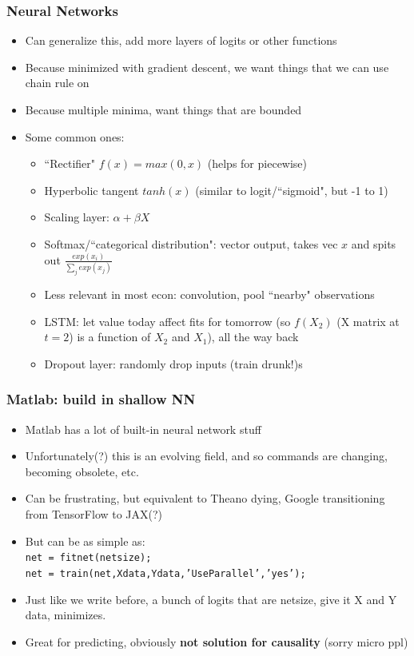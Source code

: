 \documentclass{beamer}
\begin{document}
\begin{frame}
\frametitle[alignment=center]{Neural Networks}
\begin{itemize}
\item Can generalize this, add more layers of logits or other functions
\item Because minimized with gradient descent, we want things that we can use chain rule on
\item Because multiple minima, want things that are bounded
\item Some common ones:
\begin{itemize}
\item ``Rectifier" $f(x)=max(0,x)$ (helps for piecewise)
\item Hyperbolic tangent $tanh(x)$ (similar to logit/``sigmoid", but -1 to 1)
\item Scaling layer: $\alpha+\beta X$
\item Softmax/``categorical distribution": vector output, takes vec $x$ and spits out $\frac{exp(x_i)}{\sum_j exp(x_j)}$
\item Less relevant in most econ: convolution, pool ``nearby" observations
\item LSTM: let value today affect fits for tomorrow (so $f(X_2)$ (X matrix at $t=2$) is a function of $X_2$ and $X_1$), all the way back
\item Dropout layer: randomly drop inputs (train drunk!)s
\end{itemize}
\end{itemize}
\end{frame}


\begin{frame}
\frametitle[alignment=center]{Matlab: build in shallow NN}
\begin{itemize}
\item Matlab has a lot of built-in neural network stuff
\bigskip
\item Unfortunately(?) this is an evolving field, and so commands are changing, becoming obsolete, etc.
\bigskip
\item Can be frustrating, but equivalent to Theano dying, Google transitioning from TensorFlow to JAX(?)
\bigskip
\item But can be as simple as:\\
\texttt{net = fitnet(netsize);}\\
\texttt{net = train(net,Xdata,Ydata,'UseParallel','yes');}\\
 \item Just like we write before, a bunch of logits that are netsize, give it X and Y data, minimizes.
 \bigskip
 \item Great for predicting, obviously \textbf{not solution for causality} (sorry micro ppl)
\end{itemize}
\end{frame}
\end{document}
